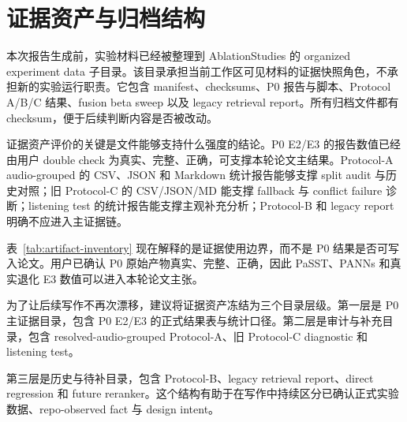 \chapter{证据资产与归档结构}

本次报告生成前，实验材料已经被整理到 AblationStudies 的 organized experiment data 子目录。该目录承担当前工作区可见材料的证据快照角色，不承担新的实验运行职责。它包含 manifest、checksums、P0 报告与脚本、Protocol A/B/C 结果、fusion beta sweep 以及 legacy retrieval report。所有归档文件都有 checksum，便于后续判断内容是否被改动。

证据资产评价的关键是文件能够支持什么强度的结论。P0 E2/E3 的报告数值已经由用户 double check 为真实、完整、正确，可支撑本轮论文主结果。Protocol-A audio-grouped 的 CSV、JSON 和 Markdown 统计报告能够支撑 split audit 与历史对照；旧 Protocol-C 的 CSV/JSON/MD 能支撑 fallback 与 conflict failure 诊断；listening test 的统计报告能支撑主观补充分析；Protocol-B 和 legacy report 明确不应进入主证据链。

\begin{table}[H]
	\centering
	\caption{主要证据资产、来源状态与论文用途。}
	\label{tab:artifact-inventory}
	\small
\end{table}

表~\ref{tab:artifact-inventory} 现在解释的是证据使用边界，而不是 P0 结果是否可写入论文。用户已确认 P0 原始产物真实、完整、正确，因此 PaSST、PANNs 和真实退化 E3 数值可以进入本轮论文主张。

为了让后续写作不再次漂移，建议将证据资产冻结为三个目录层级。第一层是 P0 主证据目录，包含 P0 E2/E3 的正式结果表与统计口径。第二层是审计与补充目录，包含 resolved-audio-grouped Protocol-A、旧 Protocol-C diagnostic 和 listening test。

第三层是历史与待补目录，包含 Protocol-B、legacy retrieval report、direct regression 和 future reranker。这个结构有助于在写作中持续区分已确认正式实验数据、repo-observed fact 与 design intent。

